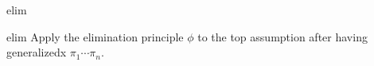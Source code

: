 \begin{tactic}{elim}
  \begin{tsyntax}[empty]{elim}
  Apply the elimination principle $\phi$ to the top assumption after
  having generalizedx $\pi_1 \cdots \pi_n$.
  \end{tsyntax}
\end{tactic}
